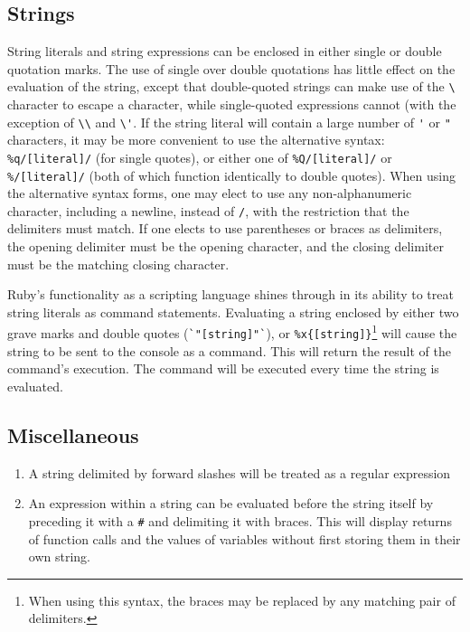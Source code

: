 \documentclass[12pt]{article}
\begin{document}
\subsection{Strings}

String literals and string expressions can be enclosed in either single or double quotation marks. The use of single over double quotations has little effect on the evaluation of the string, except that double-quoted strings can make use of the \verb|\| character to escape a character, while single-quoted expressions cannot (with the exception of \verb|\\| and \verb|\'|. If the string literal will contain a large number of \verb|'| or \verb |"| characters, it may be more convenient to use the alternative syntax: \verb|%q/[literal]/| (for single quotes), or either one of \verb|%Q/[literal]/| or \verb|%/[literal]/| (both of which function identically to double quotes). When using the alternative syntax forms, one may elect to use any non-alphanumeric character, including a newline, instead of \verb|/|, with the restriction that the delimiters must match. If one elects to use parentheses or braces as delimiters, the opening delimiter must be the opening character, and the closing delimiter must be the matching closing character\cite{huihoo}.

Ruby's functionality as a scripting language shines through in its ability to treat string literals as command statements. Evaluating a string enclosed by either two grave marks and double quotes (\verb|`"[string]"`|), or \verb|%x{[string]}|\footnote{When using this syntax, the braces may be replaced by any matching pair of delimiters.} will cause the string to be sent to the console as a command. This will return the result of the command's execution. The command will be executed every time the string is evaluated\cite{huihoo}.

\subsection{Miscellaneous}
\begin{enumerate}
    \item{A string delimited by forward slashes will be treated as a regular expression}
    \item{An expression within a string can be evaluated before the string itself by preceding it with a \verb|#| and delimiting it with braces. This will display returns of function calls and the values of variables without first storing them in their own string.}
\end{enumerate}
\end{document}
